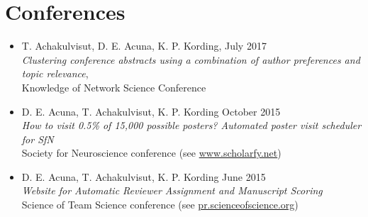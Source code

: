 \section{\sc Conferences}

\begin{itemize}[leftmargin=0cm, label={}]

\item T. Achakulvisut, D. E. Acuna, K. P. Kording, \hfill July 2017\\ {\em Clustering conference abstracts using a combination of author preferences and topic relevance}, \\Knowledge of Network Science Conference

\item D. E. Acuna, T. Achakulvisut, K. P. Kording \hfill October 2015\\
{\em How to visit 0.5\% of 15,000 possible posters? Automated poster visit scheduler for SfN}\\ Society for Neuroscience conference (see \href{http://www.scholarfy.net/}{www.scholarfy.net})

\item D. E. Acuna, T. Achakulvisut, K. P. Kording \hfill June 2015\\
{\em Website for Automatic Reviewer Assignment and Manuscript Scoring}\\
Science of Team Science conference (see \href{http://pr.scienceofscience.org/}{pr.scienceofscience.org})

\end{itemize}
